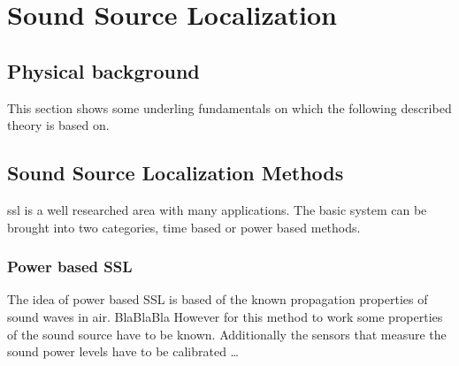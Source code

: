 \graphicspath{ {images/2_source_localization/} }
\chapter{Sound Source Localization}
\section{Physical background}
This section shows some underling fundamentals on which the following described theory is based on.

\section{Sound Source Localization Methods}
\acrfull{ssl}  is a well researched area with many applications.
\cite{nat_skript}
The basic system can be brought into two categories, time based or power based methods.
\subsection{Power based SSL}
The idea of power based SSL is based of the known propagation properties of sound waves in air.
BlaBlaBla 
However for this method to work some properties of the sound source have to be known.
Additionally the sensors that measure the sound power levels have to be calibrated \dots

